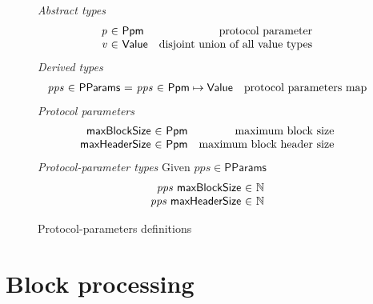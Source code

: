 \documentclass[11pt,a4paper]{article}
\newcommand{\var}[1]{\mathit{#1}}
\newcommand{\type}[1]{\mathsf{#1}}
\newcommand{\pp}[1]{\mathsf{#1}}
\newcommand{\ProtParams}{\type{PParams}} %
\newcommand{\ProtPm}{\ensuremath{\type{Ppm}}}
\newcommand{\maxblocksize}{\pp{maxBlockSize}}
\newcommand{\maxheadersize}{\pp{maxHeaderSize}}
\begin{document}
\begin{figure}[ht]
  \emph{Abstract types}
  \begin{equation*}
    \begin{array}{r@{~\in~}lr}
      \var{p} & \ProtPm & \text{protocol parameter}\\
      \var{v} & \type{Value} & \text{disjoint union of all value types}\\
    \end{array}
  \end{equation*}
  \emph{Derived types}
  \begin{equation*}
    \begin{array}{r@{~\in~}l@{~=~}r@{~\in~}lr}
      \var{pps} & \ProtParams & \var{pps} & \ProtPm \mapsto \type{Value}
      & \text{protocol parameters map}\\
    \end{array}
  \end{equation*}
  \emph{Protocol parameters}
  \begin{equation*}
    \begin{array}{r@{~\in~}lr}
      \maxblocksize{} & \ProtPm & \text{maximum block size}\\
      \maxheadersize{} & \ProtPm & \text{maximum block header size} \\
    \end{array}
  \end{equation*}
  \emph{Protocol-parameter types} Given $\var{pps} \in \ProtParams$
  \begin{equation*}
    \begin{array}{r@{~\in~}l}
      \var{pps}~\maxblocksize{} & \mathbb{N}\\
      \var{pps}~\maxheadersize{} & \mathbb{N} \\
    \end{array}
  \end{equation*}
  \caption{Protocol-parameters definitions}
  \label{fig:prot-params-defs}
\end{figure}


\clearpage

\section{Block processing}
\label{sec:block-processing}

\newcommand{\BHEnv}{\type{BHEnv}}
\newcommand{\BHState}{\type{BHState}}

\newcommand{\BBEnv}{\type{BBEnv}}
\newcommand{\BBState}{\type{BBState}}
\end{document}
